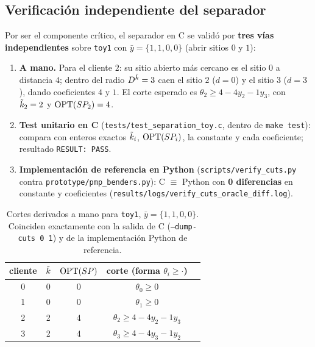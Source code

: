\subsection{Verificación independiente del separador}
\label{sub:verif}
Por ser el componente crítico, el separador en C se validó por \textbf{tres vías independientes}
sobre \texttt{toy1} con $\bar y=\{1,1,0,0\}$ (abrir sitios $0$ y $1$):
\begin{enumerate}[noitemsep]
  \item \textbf{A mano.} Para el cliente $2$: su sitio abierto más cercano es el sitio $0$ a
        distancia $4$; dentro del radio $D^{\tilde{k}}=3$ caen el sitio $2$ ($d=0$) y el sitio $3$
        ($d=3$), dando coeficientes $4$ y $1$. El corte esperado es
        $\theta_2\ge 4-4y_2-1y_3$, con $\tilde{k}_2=2$ y $\mathrm{OPT}(SP_2)=4$.
  \item \textbf{Test unitario en C} (\texttt{tests/test\_separation\_toy.c}, dentro de
        \texttt{make test}): compara con enteros exactos $\tilde{k}_i$, $\mathrm{OPT}(SP_i)$, la constante y
        cada coeficiente; resultado \texttt{RESULT: PASS}.
  \item \textbf{Implementación de referencia en Python} (\texttt{scripts/verify\_cuts.py} contra
        \texttt{prototype/pmp\_benders.py}): C $\equiv$ Python con \textbf{0 diferencias} en
        constante y coeficientes (\texttt{results/logs/verify\_cuts\_oracle\_diff.log}).
\end{enumerate}
\begin{table}[h]\centering
\begin{tabular}{ccccl}
\toprule
cliente & $\tilde{k}$ & $\mathrm{OPT}(SP)$ & corte (forma $\theta_i\ge\cdot$) \\
\midrule
0 & 0 & 0 & $\theta_0\ge 0$ \\
1 & 0 & 0 & $\theta_1\ge 0$ \\
2 & 2 & 4 & $\theta_2\ge 4-4y_2-1y_3$ \\
3 & 2 & 4 & $\theta_3\ge 4-4y_3-1y_2$ \\
\bottomrule
\end{tabular}
\caption{Cortes derivados a mano para \texttt{toy1}, $\bar y=\{1,1,0,0\}$. Coinciden exactamente
con la salida de C (\texttt{--dump-cuts 0 1}) y de la implementación Python de referencia.}
\end{table}
